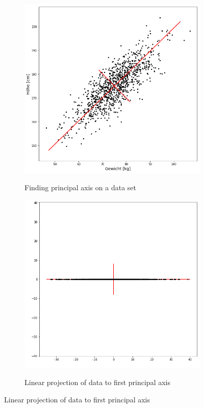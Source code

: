 \documentclass{beamer}
\theoremstyle{plain}
\theoremstyle{definition}
\begin{document}
\begin{frame}
\begin{figure}
\centering
	\begin{subfigure}{0.45\textwidth}
	\centering
	\captionsetup{justification=centering}
	\includegraphics[width = \textwidth]{figures/pca_example.png}
	\label{pca_example_original}
	\caption{Finding principal axis on a data set}
	\end{subfigure}
	\begin{subfigure}{0.45\textwidth}
	\centering
	\captionsetup{justification=centering}
	\includegraphics[width = \textwidth]{figures/pca_example_rotated.png}
	\label{pca_example_rotated}
	\caption{Linear projection of data to first principal axis}
	\end{subfigure}

\label{pca_example}
\end{figure}
\end{frame}
\end{document}
